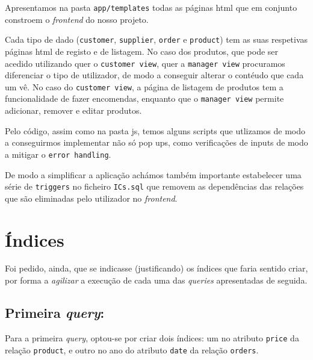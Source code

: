 \documentclass[12pt,a4paper]{article}
\begin{document}
Apresentamos na pasta \texttt{app/templates} todas as páginas html que em conjunto constroem o \textit{frontend}
do nosso projeto.

Cada tipo de dado (\texttt{customer}, \texttt{supplier}, \texttt{order} e \texttt{product}) tem as suas respetivas páginas html de
registo e de listagem. No caso dos produtos, que pode ser acedido utilizando quer o \texttt{customer view},
quer a \texttt{manager view} procuramos diferenciar o tipo de utilizador, de modo a conseguir alterar o
contéudo que cada um vê. No caso do \texttt{customer view}, a página de listagem de produtos tem a funcionalidade
de fazer encomendas, enquanto que o \texttt{manager view} permite adicionar, remover e editar produtos.

Pelo código, assim como na pasta js, temos alguns scripts que utlizamos de modo
a conseguirmos implementar não só pop ups, como verificações de inputs de modo
a mitigar o \texttt{error handling}.

De modo a simplificar a aplicação achámos também importante estabelecer uma série de \texttt{triggers} no ficheiro \texttt{ICs.sql}
que removem as dependências das relações que são eliminadas pelo utilizador no \textit{frontend}.

\section*{Índices}

Foi pedido, ainda, que se indicasse (justificando) os índices que faria sentido
criar, por forma a \textit{agilizar} a execução de cada uma das \textit{queries}
apresentadas de seguida.

\subsection*{Primeira \textit{query}:}



Para a primeira \textit{query}, optou-se por criar dois índices: um no atributo
\texttt{price} da relação \texttt{product}, e outro no ano do atributo \texttt{date}
da relação \texttt{orders}.

\vspace*{0.25cm}
\end{document}
